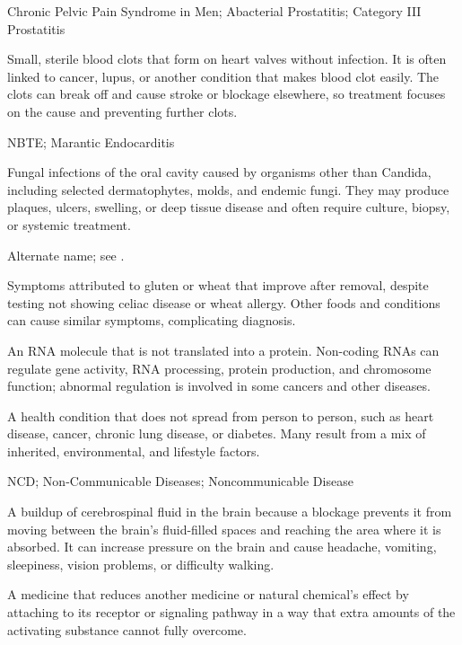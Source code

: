 \synonyms
Chronic Pelvic Pain Syndrome in Men; Abacterial Prostatitis; Category III Prostatitis

 Small, sterile blood clots that form on heart valves without infection. It is often linked to cancer, lupus, or another condition that makes blood clot easily. The clots can break off and cause stroke or blockage elsewhere, so treatment focuses on the cause and preventing further clots.

\synonyms
NBTE; Marantic Endocarditis

 Fungal infections of the oral cavity caused by organisms other than Candida, including selected dermatophytes, molds, and endemic fungi. They may produce plaques, ulcers, swelling, or deep tissue disease and often require culture, biopsy, or systemic treatment.

 Alternate name; see .

 Symptoms attributed to gluten or wheat that improve after removal, despite testing not showing celiac disease or wheat allergy. Other foods and conditions can cause similar symptoms, complicating diagnosis.

 An RNA molecule that is not translated into a protein. Non-coding RNAs can regulate gene activity, RNA processing, protein production, and chromosome function; abnormal regulation is involved in some cancers and other diseases.

 A health condition that does not spread from person to person, such as heart disease, cancer, chronic lung disease, or diabetes. Many result from a mix of inherited, environmental, and lifestyle factors.

\synonyms
NCD; Non-Communicable Diseases; Noncommunicable Disease

 A buildup of cerebrospinal fluid in the brain because a blockage prevents it from moving between the brain’s fluid-filled spaces and reaching the area where it is absorbed. It can increase pressure on the brain and cause headache, vomiting, sleepiness, vision problems, or difficulty walking.

 A medicine that reduces another medicine or natural chemical's effect by attaching to its receptor or signaling pathway in a way that extra amounts of the activating substance cannot fully overcome.

